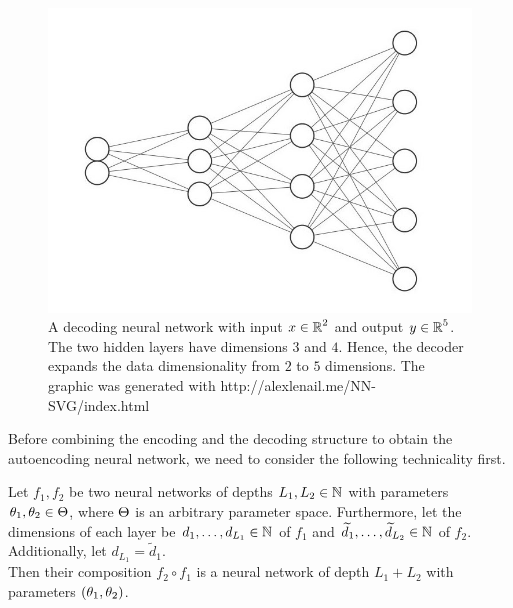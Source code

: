 \begin{figure}[H]
\begin{center}
   \begin{minipage}[b]{0.9\linewidth}
      \includegraphics[width=\linewidth]{decoder}
      \caption{A decoding neural network with input $x\in \operatorname{\mathbb{R}}^2$ and output $y \in \operatorname{\mathbb{R}}^5$. The two hidden layers have dimensions $3$ and $4$. Hence, the decoder expands the data dimensionality from $2$ to $5$ dimensions. The graphic was generated with http://alexlenail.me/NN-SVG/index.html}\label{img_decoder}
	\end{minipage}
\end{center}
\end{figure}

Before combining the encoding and the decoding structure to obtain the autoencoding neural network, we need to consider the following technicality first.

\begin{lemma}\label{lemma:composition_of_nns}
Let $f_1, f_2$ be two neural networks of depths $L_1, L_2 \in \operatorname{\mathbb{N}}$ with parameters $\theta_1, \theta_2 \in \operatorname{\Theta}$, where $\operatorname{\Theta}$ is an arbitrary parameter space. Furthermore, let the dimensions of each layer be $d_1, \ldots, d_{L_1} \in \operatorname{\mathbb{N}}$ of $f_1$ and $\widetilde{d}_1, \ldots, \widetilde{d}_{L_2} \in \operatorname{\mathbb{N}}$ of $f_2$. Additionally, let $d_{L_1} = \tilde{d}_1$.\\
Then their composition $f_2\circ f_1$ is a neural network of depth $L_1 + L_2$ with parameters $(\theta_1, \theta_2)$.
\end{lemma}

